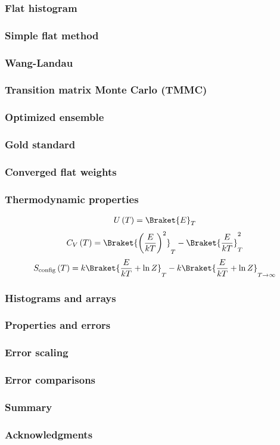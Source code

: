 \documentclass[xcolor=dvipsnames]{beamer}
\newcommand{\bk}{\Braket} %
\newcommand{\p}[1]{\left(#1\right)} %
\newcommand{\f}[2]{\dfrac{#1}{#2}}
\begin{document}
\begin{frame}
  \frametitle{Flat histogram}
\end{frame}

\begin{frame}
  \frametitle{Simple flat method}
\end{frame}

\begin{frame}
  \frametitle{Wang-Landau}
\end{frame}

\begin{frame}
  \frametitle{Transition matrix Monte Carlo (TMMC)}
\end{frame}

\begin{frame}
  \frametitle{Optimized ensemble}
\end{frame}

\begin{frame}
  \frametitle{Gold standard}
\end{frame}

\begin{frame}
  \frametitle{Converged flat weights}
\end{frame}

\begin{frame}
  \frametitle{Thermodynamic properties}
  \begin{align*}
    U\p{T}=\bk{E}_T
  \end{align*}
  \begin{align*}
    C_V\p{T}=\bk{\p{\f{E}{kT}}^2}_T-\bk{\f{E}{kT}}_T^2
  \end{align*}
  \begin{align*}
    S_{\text{config}}\p{T} =k\bk{\f{E}{kT}+\ln Z}_T
    -k\bk{\f{E}{kT}+\ln Z}_{T\to\infty}
  \end{align*}
\end{frame}

\begin{frame}
  \frametitle{Histograms and arrays}
\end{frame}

\begin{frame}
  \frametitle{Properties and errors}
\end{frame}

\begin{frame}
  \frametitle{Error scaling}
\end{frame}

\begin{frame}
  \frametitle{Error comparisons}
\end{frame}

\begin{frame}
  \frametitle{Summary}
\end{frame}

\begin{frame}
  \frametitle{Acknowledgments}
\end{frame}
\end{document}
